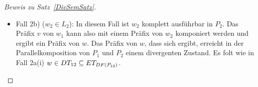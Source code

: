 \begin{proof}[Beweis zu Satz~\ref{DivSemSatz}]
\begin{itemize}
\begin{itemize}
          $v$ mit $w_2$ zu einem neuen Fehler kommen. Dazu muss unterschieden
          werden, ob $v$ das $a$ enthält, dass $P_2$ am Ende des Traces $w_2$
          nicht ausführen kann. Es gibt also ein $v'\in\Sigma _2$, so dass
          $w_2=v'a$ gilt.
          \begin{itemize}
            \item Fall 2a)(i) ($a\notin O _1$): Es kann in der
              Parallelkomposition durch das $a$ zu keinem neuen Fehler kommen.
              Das Präfix des Wortes $w$, dass $v$ in $P_1$ komplett ausgeführt
              hat, erreicht einen divergenten Zustand. Wegen der
              Abgeschlossenheit unter \cont{} gilt $w\in\DT _{12}\subseteq \ET
              _{\DF (P_{12})}$.
            \item Fall 2a)(ii) ($a\in O_1$ und $|v|_{\Synch (P_1,P_2)}| =
              |w_2|_{\Synch (P_1,P_2)}|$): Um den divergenten Zustand in
              $P_{12}$ zu erreichen, müsste den Output $a$ am Ende von $v$ mit
              den nicht sichergesetllten Input am Ende von $w_2$ synchronisiert
              werden. Es kommt also in der Parallelkomposition von $v$ und
              $w_2$ zu einem neuen Fehler. Durch die Abgeschlossenheit
              gegenüber \cont{} gilt $w\in\ET _{12}\subseteq \ET _{\DF
              (P_{12})}$.
          \end{itemize}
        \item Fall 2b) ($w_2\in L_2$): In diesem Fall ist $w_2$ komplett
          ausführbar in $P_2$. Das Präfix $v$ von $w_1$ kann also mit einem
          Präfix von $w_2$ komponiert werden und ergibt ein Präfix von $w$. Das
          Präfix von $w$, dass sich ergibt, erreicht in der Parallelkomposition
          von $P_1$ und $P_2$ einem divergenten Zustand. Es folt wie in Fall
          2a(i) $w\in \DT _{12}\subseteq \ET _{\DF (P_{12})}$.
      \end{itemize}
  \end{itemize}


\end{proof}
